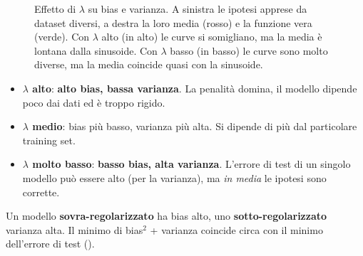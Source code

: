 \begin{figure}[ht]
\centering
{}
\caption{Effetto di $\lambda$ su bias e varianza. A sinistra le ipotesi apprese da dataset diversi, a destra la
loro media (rosso) e la funzione vera (verde). Con $\lambda$ alto (in alto) le curve si somigliano, ma la media è
lontana dalla sinusoide. Con $\lambda$ basso (in basso) le curve sono molto diverse, ma la media coincide quasi
con la sinusoide.}
\label{fig:bv-lambda}
\end{figure}

\begin{itemize}
  \item \textbf{$\lambda$ alto}: \textbf{alto bias, bassa varianza}. La penalità domina, il modello dipende poco
        dai dati ed è troppo rigido.
  \item \textbf{$\lambda$ medio}: bias più basso, varianza più alta. Si dipende di più dal particolare training
        set.
  \item \textbf{$\lambda$ molto basso}: \textbf{basso bias, alta varianza}. L'errore di test di un singolo
        modello può essere alto (per la varianza), ma \emph{in media} le ipotesi sono corrette.
\end{itemize}
Un modello \textbf{sovra-regolarizzato} ha bias alto, uno \textbf{sotto-regolarizzato} varianza alta. Il minimo di
bias$^2$ + varianza coincide circa con il minimo dell'errore di test ().


